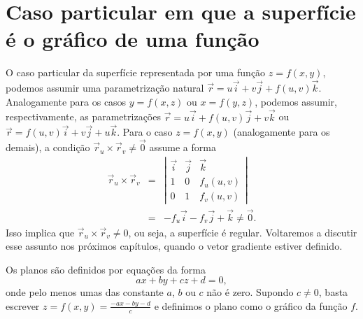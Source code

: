 \section{Caso particular em que a superfície é o gráfico de uma função}
O caso particular da superfície representada por uma função $z=f(x,y)$, podemos assumir uma parametrização natural $\vec{r}=u\vec{i}+v\vec{j}+f(u,v)\vec{k}$. Analogamente para os casos $y=f(x,z)$ ou $x=f(y,z)$, podemos assumir, respectivamente, as parametrizações $\vec{r}=u\vec{i}+f(u,v)\vec{j}+v\vec{k}$ ou $\vec{r}=f(u,v)\vec{i}+v\vec{j}+u\vec{k}$. Para o caso $z=f(x,y)$ (analogamente para os demais), a condição $\vec{r}_u\times \vec{r}_v\neq \vec{0}$ assume a forma
\begin{eqnarray*}
 \vec{r}_u\times \vec{r}_v&=&\left|\begin{array}{ccc}\vec{i}&\vec{j}&\vec{k}\\ 1&0&f_u(u,v)\\0&1&f_v(u,v)\end{array} \right|\\&=&-f_u\vec{i}-f_v\vec{j}+\vec{k}\neq \vec{0}.
\end{eqnarray*}
Isso implica que $ \vec{r}_u\times \vec{r}_v \neq 0$, ou seja, a superfície \'{e} regular. Voltaremos a discutir esse assunto nos próximos capítulos, quando o vetor gradiente estiver definido.

\begin{ex}Os planos são definidos por equações da forma
$$
ax+by+cz+d=0,
$$
onde pelo menos umas das constante $a$, $b$ ou $c$ não é zero. Supondo $c\neq0$, basta escrever $z=f(x,y)=\frac{-ax-by-d}{c}$ e definimos o plano como o gráfico da função $f$.
\end{ex}

